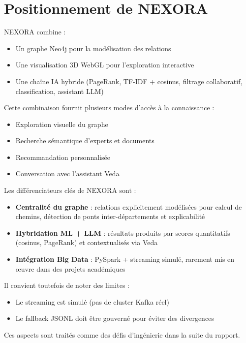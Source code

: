 \documentclass[12pt,a4paper]{report}
\begin{document}
\section{Positionnement de NEXORA}
NEXORA combine :
\begin{itemize}
  \item Un graphe Neo4j pour la modélisation des relations
  \item Une visualisation 3D WebGL pour l'exploration interactive
  \item Une chaîne IA hybride (PageRank, TF-IDF + cosinus, filtrage collaboratif, classification, assistant LLM)
\end{itemize}

Cette combinaison fournit plusieurs modes d'accès à la connaissance :
\begin{itemize}
  \item Exploration visuelle du graphe
  \item Recherche sémantique d'experts et documents
  \item Recommandation personnalisée
  \item Conversation avec l'assistant Veda
\end{itemize}

Les différenciateurs clés de NEXORA sont :
\begin{itemize}
  \item \textbf{Centralité du graphe} : relations explicitement modélisées pour calcul de chemins, détection de ponts inter-départements et explicabilité
  \item \textbf{Hybridation ML + LLM} : résultats produits par scores quantitatifs (cosinus, PageRank) et contextualisés via Veda
  \item \textbf{Intégration Big Data} : PySpark + streaming simulé, rarement mis en œuvre dans des projets académiques
\end{itemize}

Il convient toutefois de noter des limites :
\begin{itemize}
  \item Le streaming est simulé (pas de cluster Kafka réel)
  \item Le fallback JSONL doit être gouverné pour éviter des divergences
\end{itemize}

Ces aspects sont traités comme des défis d'ingénierie dans la suite du rapport.

\end{document}
